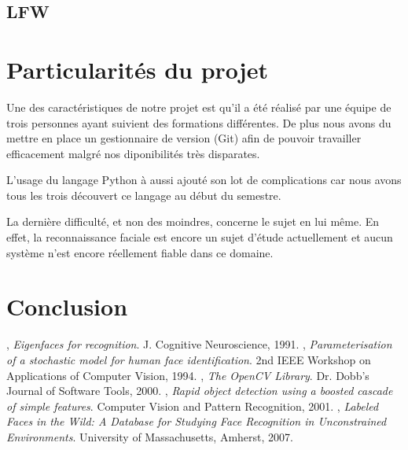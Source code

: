 \documentclass[a4paper,10pt,twocolumn]{extarticle}
\begin{document}
\subsection{LFW}

\section{Particularités du projet}
Une des caractéristiques de notre projet est qu'il a été réalisé par une équipe de trois personnes ayant suivient des formations différentes. De plus nous avons du mettre en place un gestionnaire de version (Git) afin de pouvoir travailler efficacement malgré nos diponibilités très disparates.

L'usage du langage Python à aussi ajouté son lot de complications car nous avons tous les trois découvert ce langage au début du semestre.

La dernière difficulté, et non des moindres, concerne le sujet en lui même. En effet, la reconnaissance faciale est encore un sujet d'étude actuellement et aucun système n'est encore réellement fiable dans ce domaine.

\section{Conclusion}


\begin{thebibliography}{9}
  , 
  \emph{Eigenfaces for recognition}.
  J. Cognitive Neuroscience,
  1991. 
  , 
  \emph{Parameterisation of a stochastic model for human face identification}.
  2nd IEEE Workshop on Applications of Computer Vision,
  1994.
  , 
  \emph{The OpenCV Library}.
  Dr. Dobb's Journal of Software Tools,
  2000.
  , 
  \emph{Rapid object detection using a boosted cascade of simple features}.
  Computer Vision and Pattern Recognition,
  2001.
  , 
  \emph{Labeled Faces in the Wild: A Database for Studying Face Recognition in Unconstrained Environments}.
  University of Massachusetts, Amherst,
  2007.

\end{thebibliography}
\end{document}
